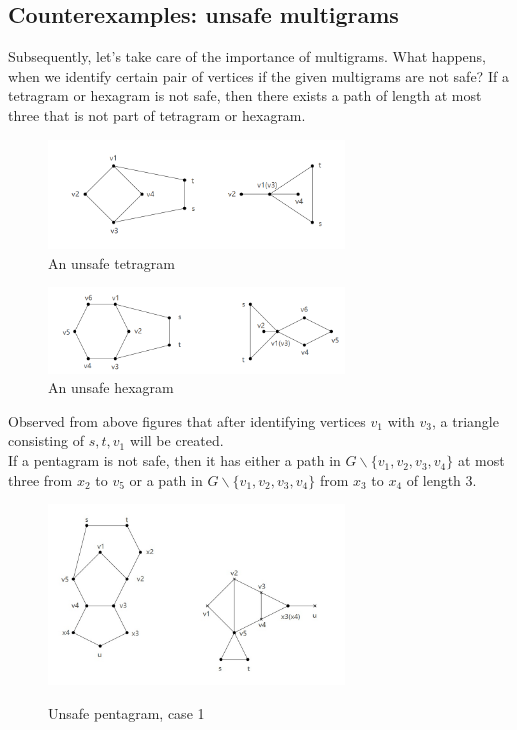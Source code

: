 \subsection{Counterexamples: unsafe multigrams}
Subsequently, let's take care of the importance of multigrams. What happens, when we identify certain pair of vertices if the given multigrams are not safe? If a tetragram or hexagram is not safe, then there exists a path of length at most three that is not part of tetragram or hexagram.
\begin{figure}[H] %
\centering %
\includegraphics[width=0.7\textwidth]{figure/unsafetetragram.png} 
\caption{An unsafe tetragram} %
\label{figure} %
\end{figure}

\begin{figure}[H] %
\centering %
\includegraphics[width=0.7\textwidth]{figure/unsafehexagram.png} 
\caption{An unsafe hexagram} %
\label{figure} %
\end{figure}
Observed from above figures that after identifying vertices $v_1$ with $v_3$, a triangle consisting of $s, t, v_1$ will be created.\newline \\
If a pentagram is not safe, then it has either a path in $G \backslash \{v_1, v_2, v_3, v_4\}$ at most three from $x_2$ to $v_5$ or a path in $G \backslash \{v_1, v_2, v_3, v_4\}$ from $x_3$ to $x_4$ of length 3.
\begin{figure}[H] %
\centering %
\includegraphics[width=0.7\textwidth]{figure/Inkedunsafepentagram1_LI.jpg} 
\label{figure} %
\caption{Unsafe pentagram, case 1}
\end{figure}

